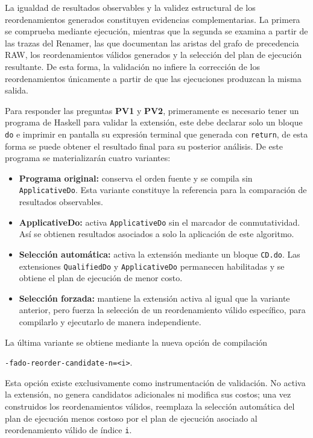La igualdad de resultados observables y la validez estructural de los reordenamientos generados constituyen evidencias complementarias. La primera se comprueba mediante ejecución, mientras que la segunda se examina a partir de las trazas del Renamer, las que documentan las aristas del grafo de precedencia RAW, los reordenamientos válidos generados y la selección del plan de ejecución resultante. De esta forma, la validación no infiere la corrección de los reordenamientos únicamente a partir de que las ejecuciones produzcan la misma salida.

Para responder las preguntas \textbf{PV1} y \textbf{PV2}, primeramente es necesario tener un programa de \textsf{Haskell} para validar la extensión, este debe declarar solo un bloque \texttt{do} e imprimir en pantalla su expresión terminal que generada con \texttt{return}, de esta forma se puede obtener el resultado final para su posterior análisis. De este programa se materializarán cuatro variantes:

\begin{itemize}
    \item \textbf{Programa original:} conserva el orden fuente y se compila sin \texttt{ApplicativeDo}. Esta variante constituye la referencia para la comparación de resultados observables.
    \item \textbf{ApplicativeDo:} activa \texttt{ApplicativeDo} sin el marcador de conmutatividad. Así se obtienen resultados asociados a solo la aplicación de este algoritmo.
    \item \textbf{Selección automática:} activa la extensión mediante un bloque \texttt{CD.do}. Las extensiones \texttt{QualifiedDo} y \texttt{ApplicativeDo} permanecen habilitadas y se obtiene el plan de ejecución de menor costo.
    \item \textbf{Selección forzada:} mantiene la extensión activa al igual que la variante anterior, pero fuerza la selección de un reordenamiento válido específico, para compilarlo y ejecutarlo de manera independiente.
\end{itemize}

La última variante se obtiene mediante la nueva opción de compilación

\begin{center}
\texttt{-fado-reorder-candidate-n=<i>}.
\end{center}

Esta opción existe exclusivamente como instrumentación de validación. No activa la extensión, no genera candidatos adicionales ni modifica sus costos; una vez construidos los reordenamientos válidos, reemplaza la selección automática del plan de ejecución menos costoso por el plan de ejecución asociado al reordenamiento válido de índice \texttt{i}.

